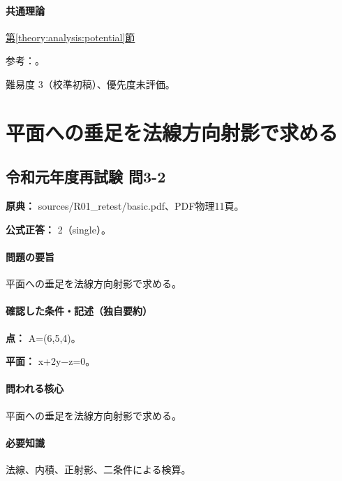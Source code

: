 \paragraph{共通理論} \hyperref[theory:analysis:potential]{第\ref*{theory:analysis:potential}節}

\par 参考：\cite{analysis57_shm}。

\par 難易度 3（校準初稿）、優先度未評価。

\section{平面への垂足を法線方向射影で求める}

\subsection{令和元年度再試験 問3-2}
\label{q:r01-ret-basic-3-2}

\noindent\textbf{原典：} sources/R01\_retest/basic.pdf、PDF物理11頁。

\textbf{公式正答：} 2（single）。

\paragraph{問題の要旨} 平面への垂足を法線方向射影で求める。

\paragraph{確認した条件・記述（独自要約）}\mbox{}\par

\noindent\textbf{点：} A=\allowbreak{}(6,5,4)。\par

\noindent\textbf{平面：} x+2y−z=\allowbreak{}0。\par

\paragraph{問われる核心} 平面への垂足を法線方向射影で求める。

\paragraph{必要知識} 法線、内積、正射影、二条件による検算。

